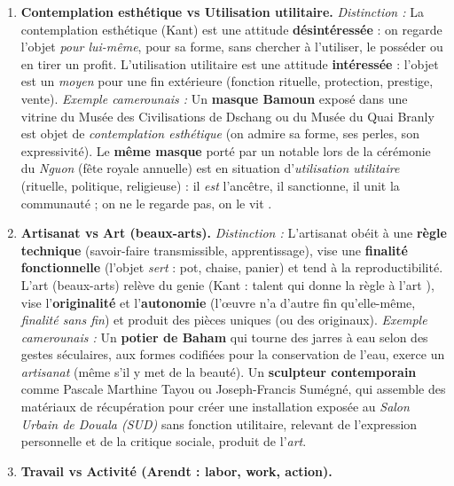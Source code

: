\documentclass[11pt]{article}
\newcommand{\cle}[1]{{\popxbold\color{popdark}#1}}
\begin{document}
\begin{corrige}
\begin{enumerate}
\item \textbf{Contemplation esthétique vs Utilisation utilitaire.}
\emph{Distinction :} La \cle{contemplation esthétique} (Kant) est une attitude \textbf{désintéressée} : on regarde l'objet \emph{pour lui-même}, pour sa forme, sans chercher à l'utiliser, le posséder ou en tirer un profit. L'\cle{utilisation utilitaire} est une attitude \textbf{intéressée} : l'objet est un \emph{moyen} pour une fin extérieure (fonction rituelle, protection, prestige, vente).
\emph{Exemple camerounais :} Un \textbf{masque Bamoun} exposé dans une vitrine du Musée des Civilisations de Dschang ou du Musée du Quai Branly est objet de \emph{contemplation esthétique} (on admire sa forme, ses perles, son expressivité). Le \textbf{même masque} porté par un notable lors de la cérémonie du \emph{Nguon} (fête royale annuelle) est en situation d'\emph{utilisation utilitaire} (rituelle, politique, religieuse) : il \emph{est} l'ancêtre, il sanctionne, il unit la communauté ; on ne le \guillemotleft regarde \guillemotright pas, on le \guillemotleft vit \guillemotright.
\item \textbf{Artisanat vs Art (beaux-arts).}
\emph{Distinction :} L'\cle{artisanat} obéit à une \textbf{règle technique} (savoir-faire transmissible, apprentissage), vise une \textbf{finalité fonctionnelle} (l'objet \emph{sert} : pot, chaise, panier) et tend à la reproductibilité. L'\cle{art} (beaux-arts) relève du \cle{genie} (Kant : \guillemotleft talent qui donne la règle à l'art \guillemotright), vise l'\textbf{originalité} et l'\textbf{autonomie} (l'œuvre n'a d'autre fin qu'elle-même, \emph{finalité sans fin}) et produit des pièces uniques (ou des originaux).
\emph{Exemple camerounais :} Un \textbf{potier de Baham} qui tourne des jarres à eau selon des gestes séculaires, aux formes codifiées pour la conservation de l'eau, exerce un \emph{artisanat} (même s'il y met de la beauté). Un \textbf{sculpteur contemporain} comme Pascale Marthine Tayou ou Joseph-Francis Sumégné, qui assemble des matériaux de récupération pour créer une installation exposée au \emph{Salon Urbain de Douala (SUD)} sans fonction utilitaire, relevant de l'expression personnelle et de la critique sociale, produit de l'\emph{art}.
\item \textbf{Travail vs Activité (Arendt : labor, work, action).}

\end{enumerate}
\end{corrige}
\end{document}

